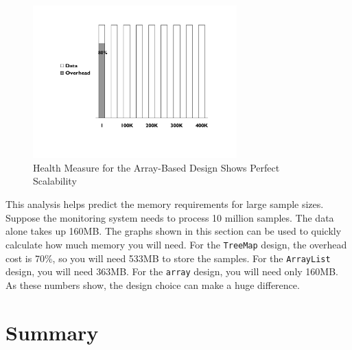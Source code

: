 \documentclass{book}
\theoremstyle{definition}
\begin{document}
\begin{figure}
  \centering
  \includegraphics[width=0.7\textwidth]{Figures/chapter3/scalable-health-array}
  \caption{Health Measure for the Array-Based Design Shows Perfect Scalability}
  \label{fig:scalable-health-array}
\end{figure}

This analysis helps predict the memory requirements for large sample sizes. Suppose the monitoring system needs to process 10 million samples. The data alone takes up 160MB.  The graphs shown in this section can be used to quickly calculate how much memory you will need. For the \texttt{TreeMap} design, the overhead cost is 70\%, so you will need 533MB to store the samples. For the \texttt{ArrayList} design, you will need 363MB. For the \texttt{array} design, you will need only 160MB. As these numbers show, the design choice can make a huge difference.

\section{Summary}
\end{document}
